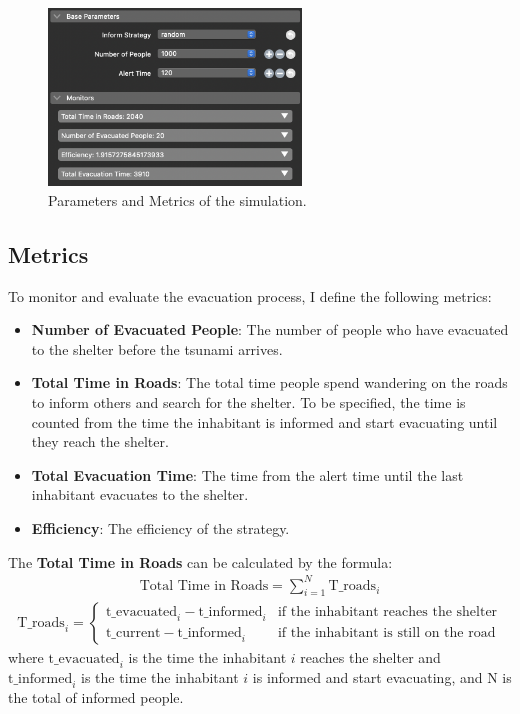 \documentclass[12pt]{article}
\begin{document}
\begin{figure}
    \centering
    \includegraphics[width=0.6\textwidth]{../images/parameters.png}
    \caption{Parameters and Metrics of the simulation.}
    \label{fig:parameters}
\end{figure}

\subsection{Metrics}

To monitor and evaluate the evacuation process, I define the following metrics:
\begin{itemize}
    \item \textbf{Number of Evacuated People}: The number of people who have evacuated to the shelter before the tsunami arrives.
    \item \textbf{Total Time in Roads}: The total time people spend wandering on the roads to inform others and search for the shelter. To be specified, the time is counted from the time the inhabitant is informed and start evacuating until they reach the shelter.
    \item \textbf{Total Evacuation Time}: The time from the alert time until the last inhabitant evacuates to the shelter.
    \item \textbf{Efficiency}: The efficiency of the strategy.
\end{itemize}

The \textbf{Total Time in Roads} can be calculated by the formula:
\begin{align*}
    \text{Total Time in Roads} = \sum_{i=1}^{N} \text{T\_roads}_i
\end{align*}
\begin{align*}
    \text{T\_roads}_i = 
    \begin{cases}
        \text{t\_evacuated}_i - \text{t\_informed}_i & \text{if the inhabitant reaches the shelter} \\
        \text{t\_current} - \text{t\_informed}_i & \text{if the inhabitant is still on the road}
    \end{cases}
\end{align*}
where $\text{t\_evacuated}_i$ is the time the inhabitant $i$ reaches the shelter and $\text{t\_informed}_i$ is the time the inhabitant $i$ is informed and start evacuating, and N is the total of informed people. \\
\end{document}
